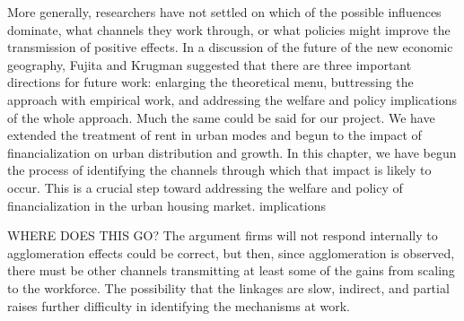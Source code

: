  More generally, researchers have not settled on which of the possible influences dominate, what channels they work through, or what policies might improve the transmission of positive effects. %
In a discussion of the future of the new economic geography, Fujita and Krugman suggested that there are three important directions for future work: enlarging the theoretical menu, buttressing the approach with empirical work, and addressing the welfare and policy implications of the whole approach. Much the same could be said for our project. We have extended the treatment of rent in urban modes and begun to the impact of financialization on urban distribution and growth. In this chapter, we have begun the process of identifying the channels through which that impact is likely to occur. This is a crucial step toward addressing the welfare and policy of financialization in the urban housing market.
 implications

WHERE DOES THIS GO? The argument firms will not respond internally to agglomeration effects could be correct, but then, since agglomeration is observed, there must be other channels transmitting at least some of the gains from scaling to the workforce. 
The possibility that the linkages are slow, indirect, and partial raises further difficulty in identifying the mechanisms at work.







